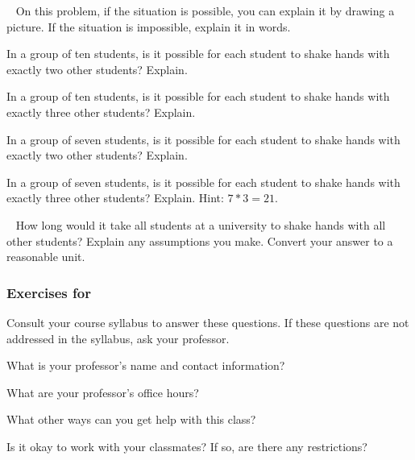\begin{exer} [\exerE]%
\label{exer_limited_handshakes}
~
    On this problem, if the situation is possible, you can explain it by drawing a picture.  If the situation is impossible, explain it in words.
    \begin{exerpart}
        \item In a group of ten students, is it possible for each student to shake hands with exactly two other students?  Explain.
        \item In a group of ten students, is it possible for each student to shake hands with exactly three other students?  Explain.
        \item In a group of seven students, is it possible for each student to shake hands with exactly two other students?  Explain.
        \item In a group of seven students, is it possible for each student to shake hands with exactly three other students?  Explain.  Hint:  $7*3=21.$
    \end{exerpart}
\end{exer}

\begin{exer} [\exerE]%
\label{exer_university_handshakes}
~
    How long would it take all  students at a university to shake hands with all other students?  Explain any assumptions you make.  Convert your answer to a reasonable unit. 
\end{exer}


\subsubsection*{Exercises for  \sublearning} 

\begin{exer} [\exerP]%
\label{exer_help}
    Consult your course syllabus to answer these questions.  If these questions are not addressed in the syllabus, ask your professor.     
    \begin{exerpart}
        \item What is your professor's name and contact information?
        \item What are your professor's office hours?
        \item What other ways can you get help with this class?
        \item Is it okay to work with your classmates?  If so, are there any restrictions?
    \end{exerpart}
\end{exer}


